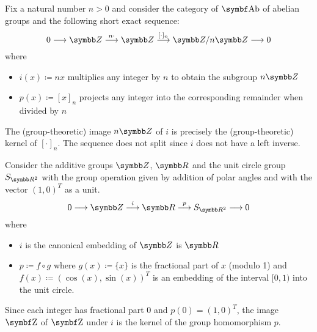 \begin{example}\label{ex:short_exact_sequences}
  \mbox{}
  \begin{defenum}
     Fix a natural number \( n > 0 \) and consider the category of \( \Bold{Ab} \) of abelian groups and the following short exact sequence:
    \begin{equation*}
      0
      \longrightarrow
      \BB{Z}
      \overset {n \cdot} \longrightarrow
      \BB{Z}
      \overset {\lbrack \cdot \rbrack_n} \longrightarrow
      \BB{Z} / n \BB{Z}
      \longrightarrow
      0
    \end{equation*}
    where
    \begin{itemize}
      \item \( i(x) \coloneqq nx \) multiplies any integer by \( n \) to obtain the subgroup \( n \BB{Z} \)
      \item \( p(x) \coloneqq [x]_n \) projects any integer into the corresponding remainder when divided by \( n \)
    \end{itemize}

    The (group-theoretic) image \( n \BB{Z} \) of \( i \) is precisely the (group-theoretic) kernel of \( [\cdot]_n \). The sequence does not split since \( i \) does not have a left inverse.

     Consider the additive groups \( \BB{Z} \), \( \BB{R} \) and the unit circle group \( S_{\BB{R}^2} \) with the group operation given by addition of polar angles and with the vector \( (1, 0)^T \) as a unit.
    \begin{equation*}
      0
      \longrightarrow
      \BB{Z}
      \overset i \longrightarrow
      \BB{R}
      \overset p \longrightarrow
      S_{\BB{R}^2}
      \longrightarrow
      0
    \end{equation*}
    where
    \begin{itemize}
      \item \( i \) is the canonical embedding of \( \BB{Z} \) is \( \BB{R} \)
      \item \( p \coloneqq f \circ g \) where \( g(x) \coloneqq \{ x \} \) is the fractional part of \( x \) (modulo 1) and \( f(x) \coloneqq (\cos(x), \sin(x))^T \) is an embedding of the interval \( [0, 1) \) into the unit circle.
    \end{itemize}

    Since each integer has fractional part \( 0 \) and \( p(0) = (1, 0)^T \), the image \( \Bold Z \) of \( \Bold Z \) under \( i \) is the kernel of the group homomorphism \( p \).


\end{defenum}
\end{example}

